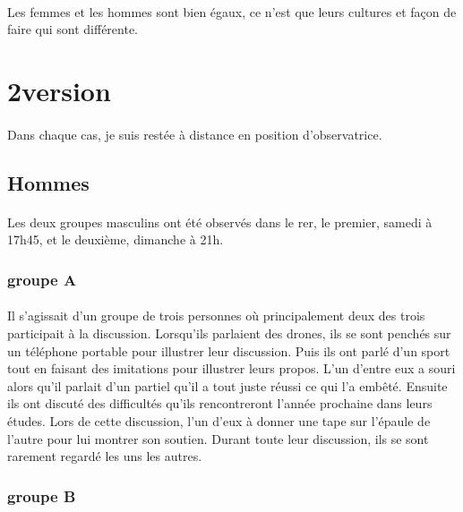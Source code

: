 \paragraph{} Les femmes et les hommes sont bien égaux, ce n'est que leurs
cultures et façon de faire qui sont différente.

\section{2\ieme version}

\paragraph{} Dans chaque cas, je suis restée à distance en position
d'observatrice.

\subsection{Hommes}

\paragraph{} Les deux groupes masculins ont été observés dans le rer, le
premier, samedi à 17h45, et le deuxième, dimanche à 21h.

\subsubsection{groupe A}

\paragraph{} Il s'agissait d'un groupe de trois personnes où principalement
deux des trois participait à la discussion. Lorsqu'ils parlaient des drones,
ils se sont penchés sur un téléphone portable pour illustrer leur discussion.
Puis ils ont parlé d'un sport tout en faisant des imitations pour illustrer
leurs propos. L'un d'entre eux a souri alors qu'il parlait d'un partiel qu'il a
tout juste réussi ce qui l'a embêté. Ensuite ils ont discuté des difficultés
qu'ils rencontreront l'année prochaine dans leurs études. Lors de cette
discussion, l'un d'eux à donner une tape sur l'épaule de l'autre pour lui
montrer son soutien. Durant toute leur discussion, ils se sont rarement regardé
les uns les autres.

\subsubsection{groupe B}

